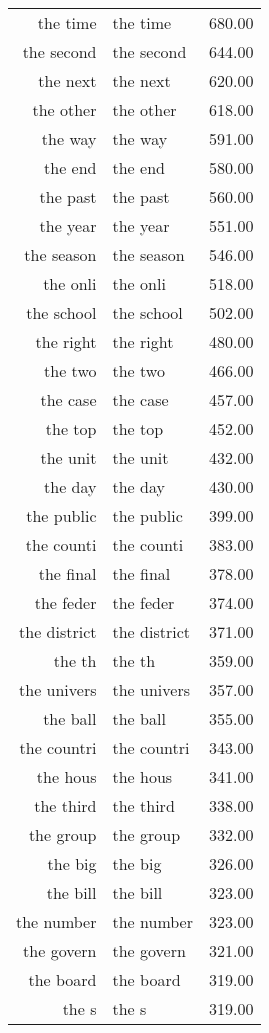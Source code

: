 \begin{table}[ht]
\begin{tabular}{rlr}
  the time & the time & 680.00 \\ 
  the second & the second & 644.00 \\ 
  the next & the next & 620.00 \\ 
  the other & the other & 618.00 \\ 
  the way & the way & 591.00 \\ 
  the end & the end & 580.00 \\ 
  the past & the past & 560.00 \\ 
  the year & the year & 551.00 \\ 
  the season & the season & 546.00 \\ 
  the onli & the onli & 518.00 \\ 
  the school & the school & 502.00 \\ 
  the right & the right & 480.00 \\ 
  the two & the two & 466.00 \\ 
  the case & the case & 457.00 \\ 
  the top & the top & 452.00 \\ 
  the unit & the unit & 432.00 \\ 
  the day & the day & 430.00 \\ 
  the public & the public & 399.00 \\ 
  the counti & the counti & 383.00 \\ 
  the final & the final & 378.00 \\ 
  the feder & the feder & 374.00 \\ 
  the district & the district & 371.00 \\ 
  the th & the th & 359.00 \\ 
  the univers & the univers & 357.00 \\ 
  the ball & the ball & 355.00 \\ 
  the countri & the countri & 343.00 \\ 
  the hous & the hous & 341.00 \\ 
  the third & the third & 338.00 \\ 
  the group & the group & 332.00 \\ 
  the big & the big & 326.00 \\ 
  the bill & the bill & 323.00 \\ 
  the number & the number & 323.00 \\ 
  the govern & the govern & 321.00 \\ 
  the board & the board & 319.00 \\ 
  the s & the s & 319.00 \\ 

\end{tabular}
\end{table}
